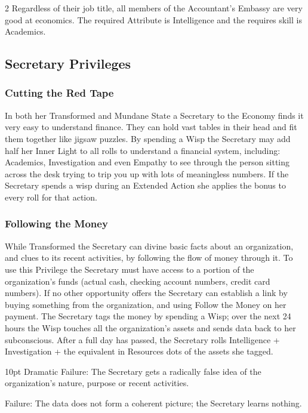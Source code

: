 \begin{multicols}{2}
Regardless of their job title, all members of the Accountant's Embassy are very good at economics. The required Attribute is Intelligence and the requires skill is Academics. 

\subsection*{Secretary Privileges}

\subsubsection*{Cutting the Red Tape}
In both her Transformed and Mundane State a Secretary to the Economy finds it very easy to understand finance. They can hold vast tables in their head and fit them together like jigsaw puzzles. By spending a Wisp the Secretary may add half her Inner Light to all rolls to understand a financial system, including: Academics, Investigation and even Empathy to see through the person sitting across the desk trying to trip you up with lots of meaningless numbers. If the Secretary spends a wisp during an Extended Action she applies the bonus to every roll for that action. 

\subsubsection*{Following the Money}

While Transformed the Secretary can divine basic facts about an organization, and clues to its recent activities, by following the flow of money through it. To use this Privilege the Secretary must have access to a portion of the organization's funds (actual cash, checking account numbers, credit card numbers). If no other opportunity offers the Secretary can establish a link by buying something from the organization, and using Follow the Money on her payment. The Secretary tags the money by spending a Wisp; over the next 24 hours the Wisp touches all the organization's assets and sends data back to her subconscious. After a full day has passed, the Secretary rolls Intelligence + Investigation + the equivalent in Resources dots of the assets she tagged.

   \begin{myindentpar}{10pt} Dramatic Failure: The Secretary gets a radically false idea of the organization's nature, purpose or recent activities. 
   
    Failure: The data does not form a coherent picture; the Secretary learns nothing. 
    

\end{myindentpar}
\end{multicols}
